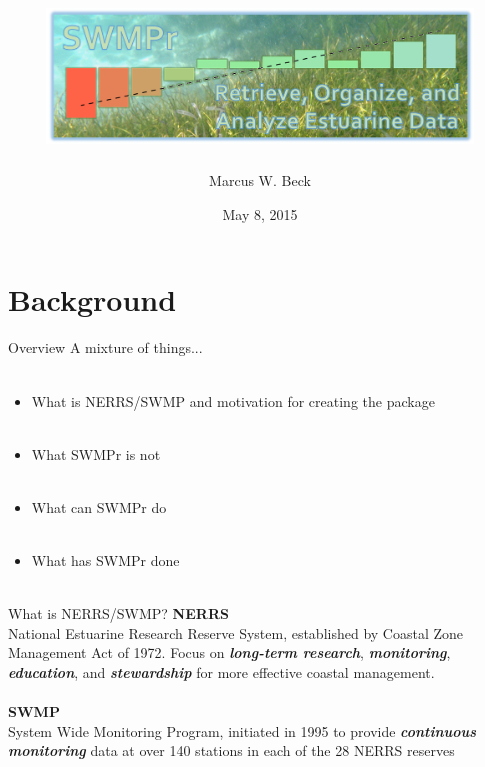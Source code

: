 \documentclass[serif]{beamer}\usepackage[]{graphicx}\usepackage[]{color}
\newcommand{\Bigtxt}[1]{\textbf{\textit{#1}}}
\begin{document}
\title[SWMPr for estuarine time series]{\includegraphics[width=0.85\textwidth]{fig/swmpr_logo.png}}

\author[M. Beck]{Marcus W. Beck}

\date{May 8, 2015}


\begin{frame}
\titlepage
\end{frame}

\section{Background}

\begin{frame}{Overview}
A mixture of things...\\~\\
\begin{itemize}
\item What is NERRS/SWMP and motivation for creating the package \\~\\
\item What SWMPr is not \\~\\
\item What can SWMPr do \\~\\
\item What has SWMPr done \\~\\
\end{itemize}
\end{frame}

\begin{frame}{What is NERRS/SWMP?}{}
{\bf NERRS}\\
National Estuarine Research Reserve System, established by Coastal Zone Management Act of 1972. Focus on \Bigtxt{long-term research}, \Bigtxt{monitoring}, \Bigtxt{education}, and \Bigtxt{stewardship} for more effective coastal management.\\~\\
{\bf SWMP}\\
System Wide Monitoring Program, initiated in 1995 to provide \Bigtxt{continuous monitoring} data at over 140 stations in each of the 28 NERRS reserves \\~\\
\end{frame}
\end{document}
